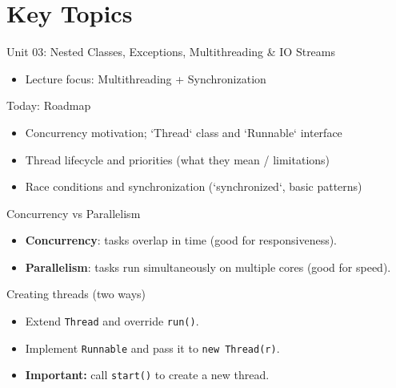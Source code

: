 \documentclass{beamer}
\begin{document}
\section{Key Topics}
\label{sec:concepts}

\begin{frame}{Unit 03: Nested Classes, Exceptions, Multithreading \& IO Streams}
  \begin{itemize}[<+->]
    \item Lecture focus: Multithreading + Synchronization
  \end{itemize}
  \slidesources{\OOPSUnitIIISources}
\end{frame}

\begin{frame}{Today: Roadmap}
  \begin{itemize}[<+->]
    \item Concurrency motivation; `Thread` class and `Runnable` interface
    \item Thread lifecycle and priorities (what they mean / limitations)
    \item Race conditions and synchronization (`synchronized`, basic patterns)
  \end{itemize}
  \slidesources{\OOPSUnitIIISources}
\end{frame}

\begin{frame}{Concurrency vs Parallelism}
  \begin{itemize}[<+->]
    \item \textbf{Concurrency}: tasks overlap in time (good for responsiveness).
    \item \textbf{Parallelism}: tasks run simultaneously on multiple cores (good for speed).
  \end{itemize}
  \slidesources{\OOPSUnitIIISources}
\end{frame}

\begin{frame}{Creating threads (two ways)}
  \begin{itemize}[<+->]
    \item Extend \texttt{Thread} and override \texttt{run()}.
    \item Implement \texttt{Runnable} and pass it to \texttt{new Thread(r)}.
    \item \textbf{Important:} call \texttt{start()} to create a new thread.
  \end{itemize}
  \slidesources{\OOPSUnitIIISources}
\end{frame}
\end{document}
